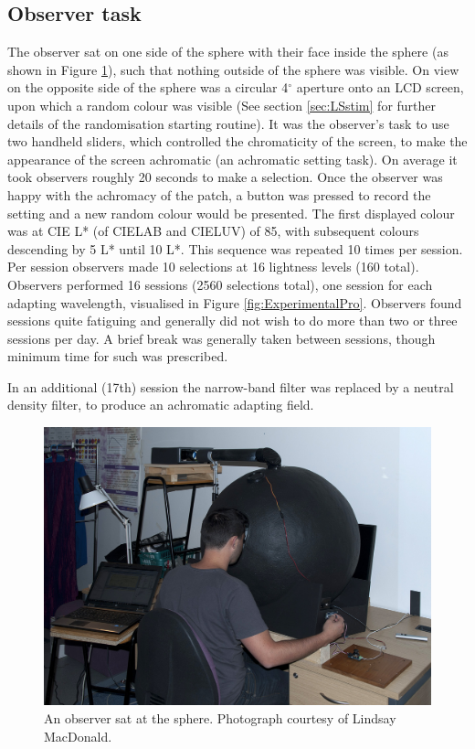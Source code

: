 \subsection{Observer task}

The observer sat on one side of the sphere with their face inside the sphere (as shown in Figure \ref{fig:Alejandro}), such that nothing outside of the sphere was visible. On view on the opposite side of the sphere was a circular 4$^{\circ}$ aperture onto an LCD screen, upon which a random colour was visible (See section \ref{sec:LSstim} for further details of the randomisation starting routine). It was the observer's task to use two handheld sliders, which controlled the chromaticity of the screen, to make the appearance of the screen achromatic (an achromatic setting task). On average it took observers roughly 20 seconds to make a selection. Once the observer was happy with the achromacy of the patch, a button was pressed to record the setting and a new random colour would be presented. The first displayed colour was at \gls{CIE} L* (of CIELAB and CIELUV) of 85, with subsequent colours descending by 5 L* until 10 L*. This sequence was repeated 10 times per session. Per session observers made 10 selections at 16 lightness levels (160 total). Observers performed 16 sessions (2560 selections total), one session for each adapting wavelength, visualised in Figure \ref{fig:ExperimentalPro}. Observers found sessions quite fatiguing and generally did not wish to do more than two or three sessions per day. A brief break was generally taken between sessions, though minimum time for such was prescribed.


In an additional (17th) session the narrow-band filter was replaced by a neutral density filter, to produce an achromatic adapting field.

\begin{figure}[htbp]
\includegraphics[max width=\textwidth]{figs/LargeSphere/Alejandro.jpg}
\caption{An observer sat at the sphere. Photograph courtesy of Lindsay MacDonald.}
\label{fig:Alejandro}
\end{figure}

